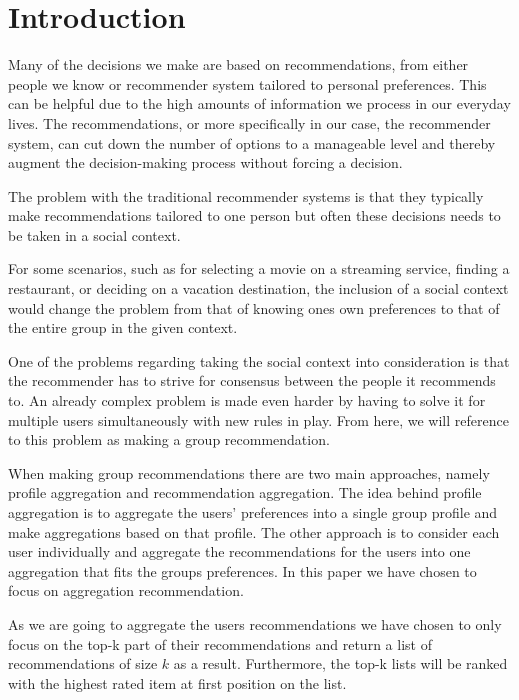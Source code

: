 \section{Introduction}
Many of the decisions we make are based on recommendations, from either people we know or recommender system tailored to personal preferences. This can be helpful due to the high amounts of information we process in our everyday lives. The recommendations, or more specifically in our case, the recommender system, can cut down the number of options to a manageable level and thereby augment the decision-making process without forcing a decision.

The problem with the traditional recommender systems is that they typically make recommendations tailored to one person but often these decisions needs to be taken in a social context. 

For some scenarios, such as for selecting a movie on a streaming service, finding a restaurant, or deciding on a vacation destination, the inclusion of a social context would change the problem from that of knowing ones own preferences to that of the entire group in the given context.

One of the problems regarding taking the social context into consideration is that the recommender has to strive for consensus between the people it recommends to. An already complex problem is made even harder by having to solve it for multiple users simultaneously with new rules in play. From here, we will reference to this problem as making a group recommendation.

When making group recommendations there are two main approaches, namely profile aggregation and recommendation aggregation\cite{profilvsrec}. The idea behind profile aggregation is to aggregate the users' preferences into a single group profile and make aggregations based on that profile. The other approach is to consider each user individually and aggregate the recommendations for the users into one aggregation that fits the groups preferences. In this paper we have chosen to focus on aggregation recommendation.


As we are going to aggregate the users recommendations we have chosen to only focus on the top-k part of their recommendations and return a list of recommendations of size $k$ as a result. Furthermore, the top-k lists will be ranked with the highest rated item at first position on the list.


